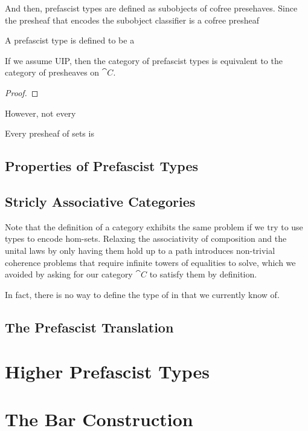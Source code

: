 And then, prefascist types are defined as subobjects of cofree presehaves. 
Since the presheaf that encodes the subobject classifier is a cofree presheaf 

\begin{definition}
  A prefascist type is defined to be a 
\end{definition}

\begin{theorem}
  If we assume UIP, then the category of prefascist types is equivalent to
  the category of presheaves on \( \cat{C} \).

\end{theorem}
\begin{proof}

\end{proof}

However, not every 
\begin{theorem}
  Every presheaf of sets is 
\end{theorem}

\subsection{Properties of Prefascist Types}

\subsection{Stricly Associative Categories}\label{sec:cat-strictification}

Note that the definition of a category exhibits the same problem if we try to
use types to encode hom-sets. 
% 
Relaxing the associativity of composition and the unital laws by only having
them hold up to a path introduces non-trivial coherence problems that require 
infinite towers of equalities to solve, which we avoided by asking for our
category \( \cat{C} \) to satisfy them by definition.

In fact, there is no way to define the type of  in \HoTT that we currently know of. 

\subsection{The Prefascist Translation}

\section{Higher Prefascist Types}

\section{The Bar Construction}